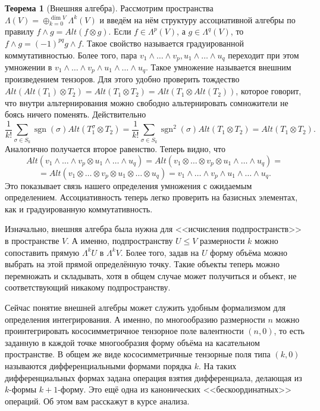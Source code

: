 \documentclass[10pt,a4paper,oneside]{book}
\theoremstyle{definition}
\newtheorem{thm}{\color{red!40!black}Теорема}
\renewcommand{\leq}{\leqslant}
\newcommand{\sgn}{\operatorname{sgn}}
\def\thrm{\begin{thm}}
\def\ethrm{\end{thm}}
\begin{document}
\thrm[Внешняя алгебра] Рассмотрим пространства $\Lambda(V)=\oplus_{k=0}^{\dim V} \Lambda^k(V)$ и введём на нём структуру ассоциативной алгебры по правилу $ f\wedge g= Alt(f\otimes g)$. Если $f\in \Lambda^p(V)$, а $g \in \Lambda^q(V)$, то $f\wedge g=(-1)^{pq}g \wedge f$. Такое свойство называется градуированной коммутативностью. Более того, пара $v_1 \wedge \dots \wedge v_p , u_1\wedge \dots \wedge u_q$ переходит при этом умножении в $v_1 \wedge \dots \wedge v_p \wedge u_1\wedge \dots \wedge u_q$. Такое умножение называется внешним произведением тензоров.
\proof Для этого удобно проверить тождество $Alt(Alt(T_1)\otimes T_2)= Alt(T_1\otimes T_2)= Alt(T_1 \otimes Alt(T_2))$, которое говорит, что внутри альтернирования можно свободно альтернировать сомножители не боясь ничего поменять. Действительно
$$\frac{1}{k!}\sum_{\sigma \in S_{k}}\sgn(\sigma) Alt(T_1^{\sigma}\otimes T_2)=\frac{1}{k!}\sum_{\sigma \in S_{k}} \sgn^2(\sigma) Alt(T_1\otimes T_2)=Alt(T_1 \otimes T_2).$$
Аналогично получается второе равенство. Теперь видно, что 
$$Alt(v_1 \wedge \dots \wedge v_p \otimes u_1\wedge \dots \wedge u_q)=Alt(v_1 \otimes \dots \otimes v_p \otimes u_1\wedge \dots \wedge u_q)=$$
$$=Alt( v_1 \otimes \dots \otimes v_p \otimes u_1\otimes \dots \otimes u_q) =v_1 \wedge \dots \wedge v_p  \wedge u_1\wedge \dots \wedge u_q .$$
Это показывает связь нашего определения умножения с ожидаемым определением. Ассоциативность теперь легко проверить на базисных элементах, как и градуированную коммутативность.
\endproof
\ethrm

Изначально, внешняя алгебра была нужна для <<исчисления подпространств>> в пространстве $V$. А именно, подпространству $U\leq V$ размерности $k$ можно сопоставить прямую $\Lambda^k U$ в $\Lambda^k V$. Более того, задав на $U$ форму объёма можно выбрать на этой прямой определённую точку. Такие объекты теперь можно перемножать и складывать, хотя в общем случае может получиться и объект, не соответствующий никакому подпространству. 

Сейчас понятие внешней алгебры может служить удобным формализмом для определения интегрирования. А именно, по многообразию размерности $n$ можно проинтегрировать кососимметричное тензорное поле валентности $(n,0)$, то есть заданную в каждой точке многообразия форму объёма на касательном пространстве. В общем же виде кососимметричные тензорные поля типа $(k,0)$ называются дифференциальными формами порядка $k$. На таких дифференциальных формах задана операция взятия дифференциала, делающая из $k$-формы $k+1$-форму. Это ещё одна из канонических <<бескоординатных>> операций. Об этом вам расскажут в курсе анализа.
\end{document}
